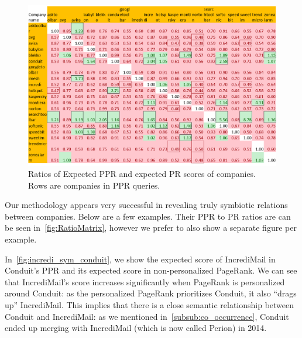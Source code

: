 \documentclass[11pt,oneside]{book}
\begin{document}
\begin{figure}[!htbp]
\centering
    \includegraphics[scale=0.8]{figures/RatioMatrixPortrate.png}
    \caption{Ratios of Expected PPR and expected PR scores of companies. Rows are companies in PPR queries.}
    \label{fig:RatioMatrix}
\end{figure}


Our methodology appears very successful in revealing truly symbiotic relations between companies. Below are a few examples. Their PPR to PR ratios are can be seen in~\autoref{fig:RatioMatrix}, however we prefer to also show a separate figure per example.

In~\autoref{fig:incredi_sym_conduit}, we show the expected score of IncrediMail in Conduit's PPR and its expected score in non-personalized PageRank. We can see that IncrediMail's score increases significantly when PageRank is personalized around Conduit: as the personalized PageRank prioritizes Conduit, it also ``drags up'' IncrediMail. This implies that there is a close semantic relationship between Conduit and IncrediMail: as we mentioned in~\autoref{subsub:co_occurrence}, Conduit ended up merging with IncrediMail (which is now called Perion) in 2014. 
\end{document}
